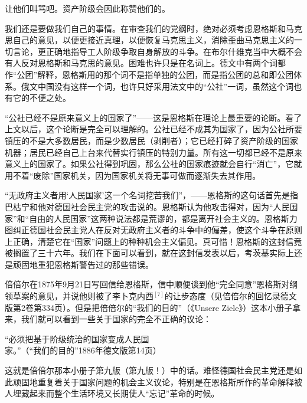 让他们叫骂吧。资产阶级会因此称赞他们的。

我们还是要做我们自己的事情。在审查我们的党纲时，绝对必须考虑恩格斯和马克思自己的意见，以便更接近真理，以便恢复马克思主义，消除歪曲马克思主义的一切言论，更正确地指导工人阶级争取自身解放的斗争。在布尔什维克当中大概不会有人反对恩格斯和马克思的意见。困难也许只是在名词上。德文中有两个词都作“公团”解释，恩格斯用的那个词{\kaishu 不是}指单独的公团，而是指公团的总和即公团体系。俄文中国没有这样一个词，也许只好采用法文中的“公社”一词，虽然这个词也有它的不便之处。

“公社已经不是原来意义上的国家了”——这是恩格斯在理论上最重要的论断。看了上文以后，这个论断是完全可以理解的。公社{\kaishu 已经不成其为}国家了，因为公社所要镇压的不是大多数居民，而是少数居民（剥削者）；它已经打碎了资产阶级的国家机器；居民已经自己上台来代替实行镇压的{\kaishu 特别}力量。所有这一切都已经不是原来意义上的国家了。如果公社得到巩固，那么公社的国家痕迹就会自行“消亡”，它就用不着“废除”国家机关，因为国家机关将无事可做而逐渐失去其作用。

“无政府主义者用‘人民国家’这一个名词挖苦我们”，——恩格斯的这句话首先是指巴枯宁和他对德国社会民主党的攻击说的。恩格斯认为他攻击得对，因为“人民国家”和“自由的人民国家”这两种说法都是荒谬的，都是离开社会主义的。恩格斯力图纠正德国社会民主党人在反对无政府主义者的斗争中的偏差，使这个斗争在原则上正确，清楚它在“国家”问题上的种种机会主义偏见。真可惜！恩格斯的这封信竟被搁置了三十六年。我们在下面可以看到，就在这封信发表以后，考茨基实际上还是顽固地重犯恩格斯警告过的那些错误。

倍倍尔在1875年9月21日写回信给恩格斯，信中顺便谈到他“完全同意”恩格斯对纲领草案的意见，并说他则被了李卜克内西$^{[7]}$的让步态度（见倍倍尔的回忆录德文版第2卷第334页）。但是把倍倍尔的“我们的目的”（《Unsere Ziele》）这本小册子拿来，我们就可以看到一些关于国家的完全不正确的议论：

\pskip
\small

“必须把基于{\kaishu 阶级统治}的国家变成{\kaishu 人民国家}。”（“我们的目的”1886年德文版第14页）

\normalsize
\pskip

这就是倍倍尔那本小册子{\kaishu 第九}版（第九版！）中的话。难怪德国社会民主党还是如此顽固地重复着关于国家问题的机会主义议论，特别是在恩格斯所作的革命解释被人埋藏起来而整个生活环境又长期使人“忘记”革命的时候。




